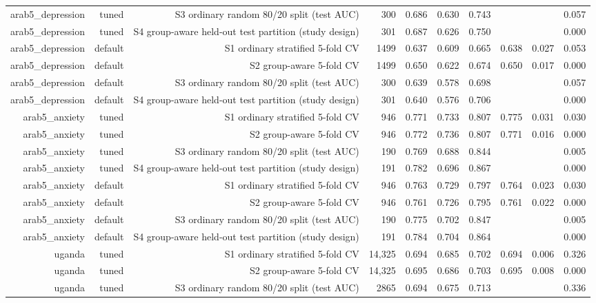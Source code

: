 \documentclass[10pt]{article}
\begin{document}
\begin{longtable}{rrrrrrrrrr}
arab5\_depression & tuned & S3 ordinary random 80/20 split (test AUC) & 300 & 0.686 & 0.630 & 0.743 &  &  & 0.057 \\
arab5\_depression & tuned & S4 group-aware held-out test partition (study design) & 301 & 0.687 & 0.626 & 0.750 &  &  & 0.000 \\
arab5\_depression & default & S1 ordinary stratified 5-fold CV & 1499 & 0.637 & 0.609 & 0.665 & 0.638 & 0.027 & 0.053 \\
arab5\_depression & default & S2 group-aware 5-fold CV & 1499 & 0.650 & 0.622 & 0.674 & 0.650 & 0.017 & 0.000 \\
arab5\_depression & default & S3 ordinary random 80/20 split (test AUC) & 300 & 0.639 & 0.578 & 0.698 &  &  & 0.057 \\
arab5\_depression & default & S4 group-aware held-out test partition (study design) & 301 & 0.640 & 0.576 & 0.706 &  &  & 0.000 \\
arab5\_anxiety & tuned & S1 ordinary stratified 5-fold CV & 946 & 0.771 & 0.733 & 0.807 & 0.775 & 0.031 & 0.030 \\
arab5\_anxiety & tuned & S2 group-aware 5-fold CV & 946 & 0.772 & 0.736 & 0.807 & 0.771 & 0.016 & 0.000 \\
arab5\_anxiety & tuned & S3 ordinary random 80/20 split (test AUC) & 190 & 0.769 & 0.688 & 0.844 &  &  & 0.005 \\
arab5\_anxiety & tuned & S4 group-aware held-out test partition (study design) & 191 & 0.782 & 0.696 & 0.867 &  &  & 0.000 \\
arab5\_anxiety & default & S1 ordinary stratified 5-fold CV & 946 & 0.763 & 0.729 & 0.797 & 0.764 & 0.023 & 0.030 \\
arab5\_anxiety & default & S2 group-aware 5-fold CV & 946 & 0.761 & 0.726 & 0.795 & 0.761 & 0.022 & 0.000 \\
arab5\_anxiety & default & S3 ordinary random 80/20 split (test AUC) & 190 & 0.775 & 0.702 & 0.847 &  &  & 0.005 \\
arab5\_anxiety & default & S4 group-aware held-out test partition (study design) & 191 & 0.784 & 0.704 & 0.864 &  &  & 0.000 \\
uganda & tuned & S1 ordinary stratified 5-fold CV & 14{,}325 & 0.694 & 0.685 & 0.702 & 0.694 & 0.006 & 0.326 \\
uganda & tuned & S2 group-aware 5-fold CV & 14{,}325 & 0.695 & 0.686 & 0.703 & 0.695 & 0.008 & 0.000 \\
uganda & tuned & S3 ordinary random 80/20 split (test AUC) & 2865 & 0.694 & 0.675 & 0.713 &  &  & 0.336 \\

\end{longtable}
\end{document}
